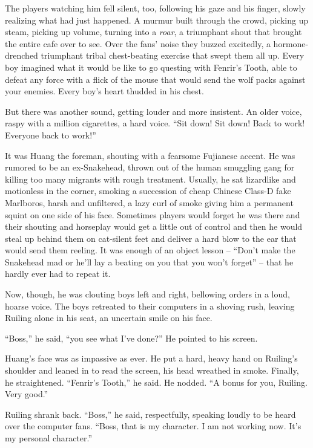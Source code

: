 The players watching him fell silent, too, following his gaze and
his finger, slowly realizing what had just happened. A murmur built
through the crowd, picking up steam, picking up volume, turning
into a \emph{roar}, a triumphant shout that brought the entire cafe
over to see. Over the fans' noise they buzzed excitedly, a
hormone-drenched triumphant tribal chest-beating exercise that
swept them all up. Every boy imagined what it would be like to go
questing with Fenrir's Tooth, able to defeat any force with a flick
of the mouse that would send the wolf packs against your enemies.
Every boy's heart thudded in his chest.

But there was another sound, getting louder and more insistent. An
older voice, raspy with a million cigarettes, a hard voice. ``Sit
down! Sit down! Back to work! Everyone back to work!''

It was Huang the foreman, shouting with a fearsome Fujianese
accent. He was rumored to be an ex-Snakehead, thrown out of the
human smuggling gang for killing too many migrants with rough
treatment. Usually, he sat lizardlike and motionless in the corner,
smoking a succession of cheap Chinese Class-D fake Marlboros, harsh
and unfiltered, a lazy curl of smoke giving him a permanent squint
on one side of his face. Sometimes players would forget he was
there and their shouting and horseplay would get a little out of
control and then he would steal up behind them on cat-silent feet
and deliver a hard blow to the ear that would send them reeling. It
was enough of an object lesson -- ``Don't make the Snakehead mad or
he'll lay a beating on you that you won't forget'' -- that he hardly
ever had to repeat it.

Now, though, he was clouting boys left and right, bellowing orders
in a loud, hoarse voice. The boys retreated to their computers in a
shoving rush, leaving Ruiling alone in his seat, an uncertain smile
on his face.

``Boss,'' he said, ``you see what I've done?'' He pointed to his
screen.

Huang's face was as impassive as ever. He put a hard, heavy hand on
Ruiling's shoulder and leaned in to read the screen, his head
wreathed in smoke. Finally, he straightened. ``Fenrir's Tooth,'' he
said. He nodded. ``A bonus for you, Ruiling. Very good.''

Ruiling shrank back. ``Boss,'' he said, respectfully, speaking loudly
to be heard over the computer fans. ``Boss, that is my character. I
am not working now. It's my personal character.''

